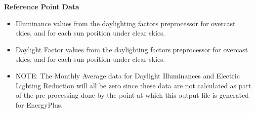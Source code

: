 \textbf{Reference Point Data}

\begin{itemize}
\item
  Illuminance values from the daylighting factors preprocessor for overcast skies, and for each sun position under clear skies.
\item
  Daylight Factor values from the daylighting factors preprocessor for overcast skies, and for each sun position under clear skies.
\item
  NOTE: The Monthly Average data for Daylight Illuminances and Electric Lighting Reduction will all be zero since these data are not calculated as part of the pre-processing done by the point at which this output file is generated for EnergyPlus.
\end{itemize}
